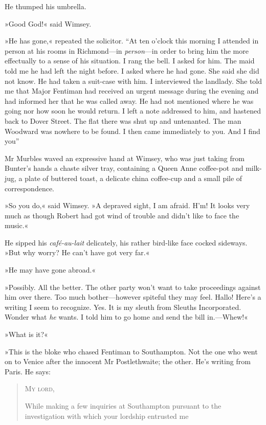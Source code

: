 He thumped his umbrella.

»Good God!« said Wimsey.

»He has gone,« repeated the solicitor. \enquote{At ten o'clock this morning I attended in person at his rooms in Richmond\allowbreak---\allowbreak in \textit{person}---in order to bring him the more effectually to a sense of his situation. I rang the bell. I asked for him. The maid told me he had left the night before. I asked where he had gone. She said she did not know. He had taken a suit-case with him. I interviewed the landlady. She told me that Major Fentiman had received an urgent message during the evening and had informed her that he was called away. He had not mentioned where he was going nor how soon he would return. I left a note addressed to him, and hastened back to Dover Street. The flat there was shut up and untenanted. The man Woodward was nowhere to be found. I then came immediately to you. And I find you\longdash}

Mr Murbles waved an expressive hand at Wimsey, who was just taking from Bunter's hands a chaste silver tray, containing a Queen Anne coffee-pot and milk-jug, a plate of buttered toast, a delicate china coffee-cup and a small pile of correspondence.

»So you do,« said Wimsey. »A depraved sight, I am afraid. H'm! It looks very much as though Robert had got wind of trouble and didn't like to face the music.«

He sipped his \textit{café-au-lait} delicately, his rather bird-like face cocked sideways. »But why worry? He can't have got very far.«

»He may have gone abroad.«

»Possibly. All the better. The other party won't want to take proceedings against him over there. Too much bother\allowbreak---\allowbreak however spiteful they may feel. Hallo! Here's a writing I seem to recognize. Yes. It is my sleuth from Sleuths Incorporated. Wonder what \textit{he} wants. I told him to go home and send the bill in.---Whew!«

»What is it?«

»This is the bloke who chased Fentiman to Southampton. Not the one who went on to Venice after the innocent Mr Postlethwaite; the other. He's writing from Paris. He says:

\begin{quotation}
\noindent \textsc{My lord,}

While making a few inquiries at Southampton pursuant to the investigation with which your lordship entrusted me 
\end{quotation}

